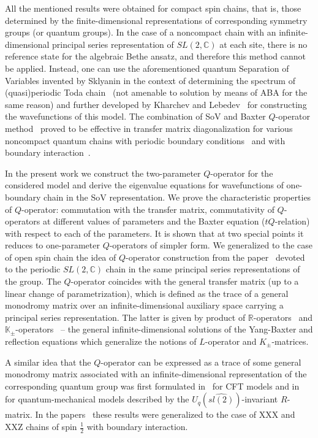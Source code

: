 \documentclass[a4paper,11pt]{article}
\numberwithin{equation}{section}
\begin{document}
All the mentioned results were obtained for compact spin chains, that is, those determined by the finite-dimensional representations of corresponding symmetry groups (or quantum groups).
In the case of a noncompact chain with an infinite-dimensional principal series representation of $SL(2,\mathbb{C})$ at each site, there is no reference state for the algebraic Bethe ansatz, and therefore this method cannot be applied.
Instead, one can use the aforementioned quantum Separation of Variables invented by Sklyanin in the context of determining the spectrum of (quasi)periodic 
Toda chain~\cite{Skl:Toda} (not amenable to solution by means of ABA for the same reason) and further developed by Kharchev and Lebedev~\cite{KL1,KL2,KL3} for constructing the wavefunctions of this model.
The combination of SoV and Baxter $Q$-operator method~\cite{Bax82} proved to be effective in transfer matrix diagonalization for various noncompact quantum chains with periodic boundary conditions~\cite{KSS00,DKM3,DKM,KMS03,BT06,FMM17,DV19,O1} and with boundary interaction~\cite{DKM2,IS,Belits19}.

In the present work we construct the two-parameter $Q$-operator for the considered model and derive the eigenvalue equations for wavefunctions of one-boundary chain in the SoV representation.
We prove the characteristic properties of $Q$-operator: commutation with the transfer matrix, commutativity of $Q$-operators at different values of parameters and the Baxter equation ($tQ$-relation) with respect to each of the parameters.
It is shown that at two special points it reduces to one-parameter $Q$-operators of simpler form.
We generalized to the case of open spin chain the idea of $Q$-operator construction from the paper~\cite{Derkachov:2005fg} devoted to the periodic $SL(2,\mathbb{C})$ chain in the same principal series representations of the group.
The $Q$-operator coincides with the general transfer matrix (up to a linear change of parametrization), which is defined as the trace of a general monodromy matrix over an infinite-dimensional auxiliary space carrying a principal series representation.
The latter is given by product of $\mathbb{R}$-operators~\cite{DKM,DM09} and $\mathbb{K}_\pm$-operators~\cite{ADV2,ABDV} -- the general infinite-dimensional solutions of the Yang-Baxter and reflection equations which generalize the notions of $L$-operator and $K_\pm$-matrices.

A similar idea that the $Q$-operator can be expressed as a trace of some general monodromy matrix associated with an infinite-dimensional representation of the corresponding quantum group was first formulated in~\cite{BLZ} for CFT models and in~\cite{AF} for quantum-mechanical models described by the $U_q(\widehat{sl(2)})$-invariant $R$-matrix.
In the papers~\cite{Frassek_2015,VlaarWest,CoopVlaarWest} these results were generalized to the case of XXX and XXZ chains of spin $\frac{1}{2}$ with boundary interaction.
\end{document}
